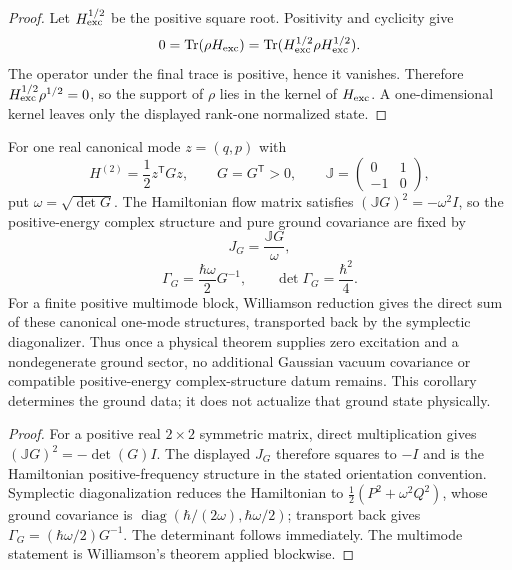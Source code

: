 \documentclass[12pt,a4paper]{article}
\begin{document}
\begin{proof}
Let \(H_{\rm exc}^{1/2}\) be the positive square root.  Positivity and
cyclicity give
\[
 0=\operatorname{Tr}(\rho H_{\rm exc})
  =\operatorname{Tr}(H_{\rm exc}^{1/2}\rho H_{\rm exc}^{1/2}).
\]
The operator under the final trace is positive, hence it vanishes.  Therefore
\(H_{\rm exc}^{1/2}\rho^{1/2}=0\), so the support of \(\rho\) lies in the
kernel of \(H_{\rm exc}\).  A one-dimensional kernel leaves only the displayed
rank-one normalized state.
\end{proof}

\begin{corollary}
\label{p4:cor:v2105-quadratic-ground-complex-structure}
For one real canonical mode \(z=(q,p)\) with
\[
 H^{(2)}=\frac12 z^{\mathsf T}Gz,\qquad G=G^{\mathsf T}>0,
 \qquad
 \mathbb J=\begin{pmatrix}0&1\\-1&0\end{pmatrix},
\]
put \(\omega=\sqrt{\det G}\).  The Hamiltonian flow matrix satisfies
\((\mathbb JG)^2=-\omega^2I\), so the positive-energy complex structure and
pure ground covariance are fixed by
\begin{equation}
\label{p4:eq:v2105-ground-complex-structure}
 \boxed{J_G=\frac{\mathbb JG}{\omega}},
\end{equation}
\begin{equation}
\label{p4:eq:v2105-ground-covariance}
 \boxed{\Gamma_G=\frac{\hbar\omega}{2}G^{-1},
 \qquad \det\Gamma_G=\frac{\hbar^2}{4}.}
\end{equation}
For a finite positive multimode block, Williamson reduction gives the direct
sum of these canonical one-mode structures, transported back by the
symplectic diagonalizer.  Thus once a physical theorem supplies zero
excitation and a nondegenerate ground sector, no additional Gaussian vacuum
covariance or compatible positive-energy complex-structure datum remains.
This corollary determines the ground data; it does not actualize that ground
state physically.
\end{corollary}

\begin{proof}
For a positive real \(2\times2\) symmetric matrix, direct multiplication gives
\((\mathbb JG)^2=-\det(G)I\).  The displayed \(J_G\) therefore squares to
\(-I\) and is the Hamiltonian positive-frequency structure in the stated
orientation convention.  Symplectic diagonalization reduces the Hamiltonian
to \(\frac12(P^2+\omega^2Q^2)\), whose ground covariance is
\(\operatorname{diag}(\hbar/(2\omega),\hbar\omega/2)\); transport back gives
\(\Gamma_G=(\hbar\omega/2)G^{-1}\).  The determinant follows immediately.
The multimode statement is Williamson's theorem applied blockwise.
\end{proof}
\end{document}

